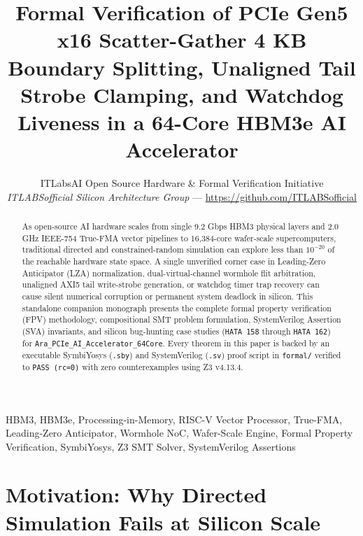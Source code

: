 \documentclass[journal,10pt,twocolumn]{IEEEtran}
\title{Formal Verification of PCIe Gen5 x16 Scatter-Gather 4 KB Boundary Splitting, Unaligned Tail Strobe Clamping, and Watchdog Liveness in a 64-Core HBM3e AI Accelerator}
\author{ITLabsAI Open Source Hardware \& Formal Verification Initiative\\
\textit{ITLABSofficial Silicon Architecture Group} --- \url{https://github.com/ITLABSofficial}}
\begin{document}
\maketitle
\begin{abstract}
As open-source AI hardware scales from single 9.2 Gbps HBM3 physical layers and 2.0 GHz IEEE-754 True-FMA vector pipelines to 16,384-core wafer-scale supercomputers, traditional directed and constrained-random simulation can explore less than $10^{-20}$ of the reachable hardware state space. A single unverified corner case in Leading-Zero Anticipator (LZA) normalization, dual-virtual-channel wormhole flit arbitration, unaligned AXI5 tail write-strobe generation, or watchdog timer trap recovery can cause silent numerical corruption or permanent system deadlock in silicon. This standalone companion monograph presents the complete formal property verification (FPV) methodology, compositional SMT problem formulation, SystemVerilog Assertion (SVA) invariants, and silicon bug-hunting case studies (\texttt{HATA 158} through \texttt{HATA 162}) for \texttt{Ara\_PCIe\_AI\_Accelerator\_64Core}. Every theorem in this paper is backed by an executable SymbiYosys (\texttt{.sby}) and SystemVerilog (\texttt{.sv}) proof script in \texttt{formal/} verified to \texttt{PASS (rc=0)} with zero counterexamples using Z3 v4.13.4.
\end{abstract}
\begin{IEEEkeywords}
HBM3, HBM3e, Processing-in-Memory, RISC-V Vector Processor, True-FMA, Leading-Zero Anticipator, Wormhole NoC, Wafer-Scale Engine, Formal Property Verification, SymbiYosys, Z3 SMT Solver, SystemVerilog Assertions
\end{IEEEkeywords}


\section{Motivation: Why Directed Simulation Fails at Silicon Scale}
\end{document}
